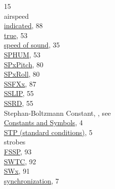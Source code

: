 \documentclass[
  english,
]{book}
\begin{document}
15\\
\hspace*{0.333em}\hspace*{0.333em}airspeed\\
\hspace*{0.333em}\hspace*{0.333em}\hspace*{0.333em}\hspace*{0.333em}\href{./10-obsolete-variables.html\#ias}{indicated},
88\\
\hspace*{0.333em}\hspace*{0.333em}\hspace*{0.333em}\hspace*{0.333em}\href{./4-the-state-of-the-atmosphere.html\#true-airspeed}{true},
53\\
\href{./4-the-state-of-the-atmosphere.html\#ATX}{speed of sound}, 35\\
\href{./4-the-state-of-the-atmosphere.html\#sphum}{SPHUM}, 53\\
\href{./8-radiation-variables.html\#spx}{SPxPitch}, 80\\
\href{./8-radiation-variables.html\#spx}{SPxRoll}, 80\\
\href{./10-obsolete-variables.html\#akfxx}{SSFXx}, 87\\
\href{./4-the-state-of-the-atmosphere.html\#sslip}{SSLIP}, 55\\
\href{./4-the-state-of-the-atmosphere.html\#ssrd}{SSRD}, 55\\
Stephan-Boltzmann Constant, , see\\
\hspace*{0.333em}\hspace*{0.333em}\href{./1-introduction.html\#constants-and-symbols}{Constants
and Symbols}, 4\\
\href{./2-general-information-about-data-files.html\#units-and-abbreviations}{STP
(standard conditions)}, 5\\
strobes\\
\hspace*{0.333em}\hspace*{0.333em}\href{./10-obsolete-variables.html\#fstrob}{FSSP},
93\\
\href{./10-obsolete-variables.html\#swtc}{SWTC}, 92\\
\href{./10-obsolete-variables.html\#swx}{SWx}, 91\\
\href{./2-general-information-about-data-files.html\#synchronization-of-measurements}{synchronization},
7\\
\end{document}

